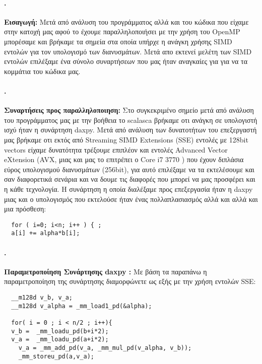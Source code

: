 \documentclass[greek,booktabs,8pt,flagBlueCMYK]{report}
\begin{document}
\paragraph{.} \textbf{Εισαγωγή:}\newline
Μετά από ανάλυση του προγράμματος αλλά και του κώδικα που είχαμε στην κατοχή μας αφού το έχουμε παραλληλοποιήσει με την χρήση του OpenMP μπορέσαμε και βρήκαμε τα σημεία στα οποία υπήρχε η ανάγκη χρήσης SIMD εντολών για τον υπολογισμό των διανυσμάτων. Μετά απο εκτενεί μελέτη των SIMD εντολών επιλέξαμε ένα σύνολο συναρτήσεων που μας ήταν αναγκαίες για για να τα κομμάτια του κώδικα μας.

\paragraph{.} \textbf{Συναρτήσεις προς παραλληλοποιηση:}\newline
Στο συγκεκριμένο σημείο μετά από ανάλυση του προγράμματος μας με την βοήθεια το scalasca βρήκαμε οτι ανάγκη σε υπολογιστή ισχύ ήταν η συνάρτηση daxpy. Μετά από ανάλυση των δυνατοτήτων του επεξεργαστή μας βρήκαμε οτι εκτός από Streaming SIMD Extensions (SSE) εντολές με 128bit vectors είχαμε δυνατότητα τρέξουμε επιπλέον και εντολές Advanced Vector eXtension (AVX, μιας και μας το επιτρέπει ο Core i7 3770 ) που έχουν διπλάσια εύρος υπολογισμού διανυσμάτων (256bit), για αυτό επιλέξαμε να τα εκτελέσουμε και σαν διαφορετικά σενάρια και να δουμε τις διαφορές που μπορεί να μας προσφέρει και η κάθε τεχνολογία. Η συνάρτηση η οποία διαλέξαμε προς επεξεργασία ήταν η daxpy μιας και ο υπολογισμός που εκτελούσε ήταν ένας πολλαπλασιασμός αλλά και αλλά και μια πρόσθεση:

\begin{lstlisting}
  for ( i=0; i<n; i++ ) { ;
  a[i] += alpha*b[i]; 
\end{lstlisting}

\paragraph{.} \textbf{Παραμετροποίηση Συνάρτησης daxpy :}\newline
Με βάση τα παραπάνω η παραμετροποίηση της συνάρτησης διαμορφώνετε ως εξής με την χρήση εντολών SSE:
\begin{lstlisting}
  __m128d v_b, v_a; 
  __m128d v_alpha = _mm_load1_pd(&alpha);  
  
  for( i = 0 ; i < n/2 ; i++){ 
  v_b =  _mm_loadu_pd(b+i*2); 
  v_a =  _mm_loadu_pd(a+i*2); 
	v_a = _mm_add_pd(v_a, _mm_mul_pd(v_alpha, v_b)); 
	_mm_storeu_pd(a,v_a);
\end{lstlisting}
\end{document}
